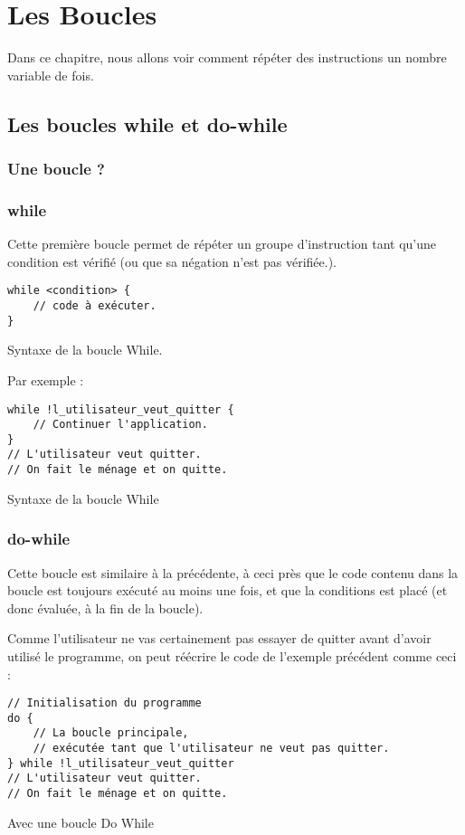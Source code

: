 \chapter{Les Boucles}
Dans ce chapitre, nous allons voir comment
répéter des instructions un nombre variable de fois.
\section{Les boucles while et do-while}
\subsection{Une boucle ?}

\subsection{while}
Cette première boucle permet de répéter un groupe d'instruction tant qu'une condition est vérifié (ou que sa négation n'est pas vérifiée.).

\begin{listing}[h]
\begin{verbatim}
while <condition> {
    // code à exécuter.
}
\end{verbatim}
\caption{Syntaxe de la boucle While.}
\end{listing}

Par exemple :
\begin{listing}[h]
\begin{verbatim}
while !l_utilisateur_veut_quitter {
    // Continuer l'application.
}
// L'utilisateur veut quitter.
// On fait le ménage et on quitte.
\end{verbatim}
\caption{Syntaxe de la boucle While}
\end{listing}
\subsection{do-while}
Cette boucle est similaire à la précédente, à ceci près que le code contenu dans la boucle est toujours exécuté au moins une fois, et que la conditions est placé (et donc évaluée, à la fin de la boucle).

Comme l'utilisateur ne vas certainement pas essayer de quitter avant d'avoir utilisé le programme, on peut réécrire le code de l'exemple précédent comme ceci :
\begin{listing}[h]
\begin{verbatim}
// Initialisation du programme
do {
    // La boucle principale,
    // exécutée tant que l'utilisateur ne veut pas quitter.
} while !l_utilisateur_veut_quitter
// L'utilisateur veut quitter.
// On fait le ménage et on quitte.
\end{verbatim}
\caption{Avec une boucle Do While}
\end{listing}

